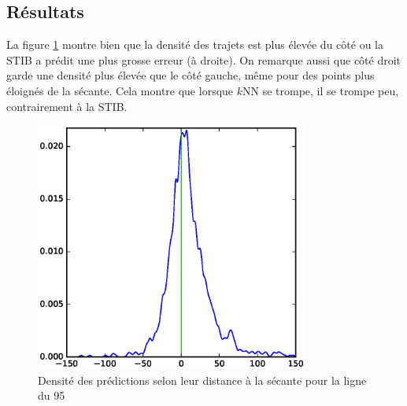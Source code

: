 \documentclass[letterpaper]{article}
\begin{document}
\begin{appendices}
\FloatBarrier
\section{Résultats}

La figure \ref{fig:density} montre bien que la densité des trajets est plus élevée du côté ou la STIB a prédit une plus grosse erreur (à droite). On remarque aussi que côté droit garde une densité plus élevée que le côté gauche, même pour des points plus éloignés de la sécante. Cela montre que lorsque $k$NN se trompe, il se trompe peu, contrairement à la STIB.

\begin{figure}[h]
   \centerline{\includegraphics[width=9cm]{density.eps}}
   \caption{\label{fig:density} Densité des prédictions selon leur distance à la sécante pour la ligne du 95}
\end{figure}


\end{appendices}
\end{document}
